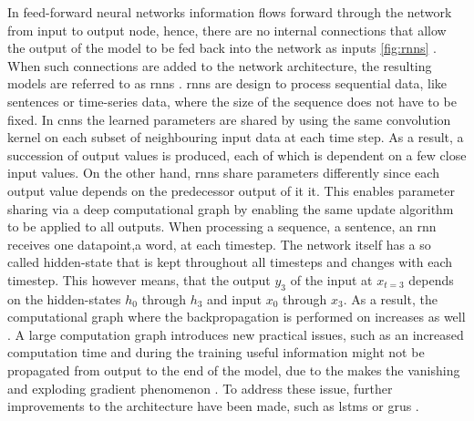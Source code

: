 In feed-forward neural networks information flows forward through the network from input to output node, hence, there are no internal connections that allow
the output of the model to be fed back into the network as inputs \autoref{fig:rnns} \cite{aggarwal2018NeuralNetworksDeep, Goodfellow-et-al-2016}.
When such connections are added to the network architecture, the resulting models are referred to as \glspl{rnn} \cite{rumelhart1986LearningRepresentationsBackpropagating}.
\Glspl{rnn} are design to process sequential data, like sentences or time-series data, where the size of the sequence does not have to be fixed.
In \glspl{cnn} the learned parameters are shared by using the same convolution kernel on each subset of neighbouring input data at each time step. 
As a result, a succession of output values is produced, each of which is dependent on a few close input values. 
On the other hand, \glspl{rnn} share parameters differently since each output value depends on the predecessor output of it it. 
This enables parameter sharing via a deep computational graph by enabling the same update algorithm to be applied to all outputs.
When processing a sequence, \eg a sentence, an \gls{rnn} receives one datapoint,\eg a word, at each timestep.
The network itself has a so called hidden-state that is kept throughout all timesteps and changes with each timestep.
This however means, that the output $y_3$ of the input at $x_{t=3}$ depends on the hidden-states $h_0$ through $h_3$ and input $x_0$ through $x_3$.
As a result, the computational graph where the backpropagation is performed on increases as well \cite{aggarwal2018NeuralNetworksDeep}.
A large computation graph introduces new practical issues, such as an increased computation time and during the training useful information might not be propagated from output to the end of the model,
due to the makes the vanishing and exploding gradient phenomenon \cite{aggarwal2018NeuralNetworksDeep}.
To address these issue, further improvements to the architecture have been made, such as \glspl{lstm} \cite{hochreiter1997LongShortTermMemory} or \glspl{gru} \cite{cho2014PropertiesNeuralMachine}.


